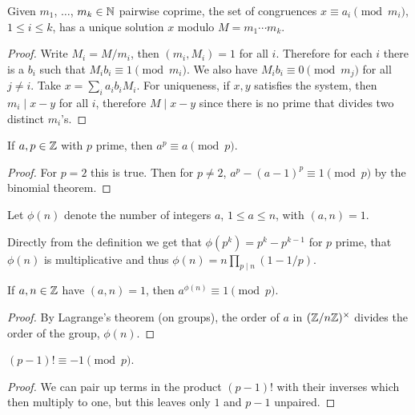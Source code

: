 \documentclass[a4paper, 10pt]{amsart}
\begin{document}
\begin{theorem}
    Given $m_1$, $\dots$, $m_k \in \mathbb{N}$ pairwise coprime, the set of congruences $x \equiv a_i \pmod{m_i}$, $1 \leq i \leq k$, has a unique solution $x$ modulo $M = m_1 \cdots m_k$.
\end{theorem}
\begin{proof}
  Write $M_i=M / m_i$, then $\left(m_i, M_i\right)=1$ for all $i$. Therefore for each $i$ there is a $b_i$ such that $M_i b_i \equiv 1\pmod{m_i}$. We also have $M_i b_i \equiv 0 \pmod{m_j}$ for all $j \neq i$. Take $x=\sum_i a_i b_i M_i$. For uniqueness, if $x, y$ satisfies the system, then $m_i \mid x-y$ for all $i$, therefore $M \mid x-y$ since there is no prime that divides two distinct $m_i$'s.
\end{proof}

\begin{theorem}
  If $a, p \in \mathbb{Z}$ with $p$ prime, then $a^p \equiv a \pmod{p}$.
\end{theorem}
\begin{proof}
  For $p = 2$ this is true. Then for $p \neq 2$, $a^p - (a-1)^p \equiv 1 \pmod{p}$ by the binomial theorem. 
\end{proof}

\begin{definition}
Let $\phi(n)$ denote the number of integers $a$, $1 \leq a \leq n$, with $(a, n) = 1$.
\end{definition}

\begin{remark}
  Directly from the definition we get that $\phi(p^k) = p^k - p^{k-1}$ for $p$ prime, that $\phi(n)$ is multiplicative and thus $\phi(n) = n \prod_{p \mid n} (1 - 1/p)$.
\end{remark}

\begin{theorem}
  If $a, n \in \mathbb{Z}$ have $(a, n) = 1$, then $a^{\phi(n)} \equiv 1 \pmod{p}$.
\end{theorem}
\begin{proof}
By Lagrange's theorem (on groups), the order of $a$ in $(\mathbb{Z}/n\mathbb{Z})^\times$ divides the order of the group, $\phi(n)$.
\end{proof}

\begin{theorem}[Wilson]
$(p - 1)! \equiv -1 \pmod{p}$.
\end{theorem}
\begin{proof}
  We can pair up terms in the product $(p-1)!$ with their inverses which then multiply to one, but this leaves only $1$ and $p - 1$ unpaired.
\end{proof}
\end{document}
